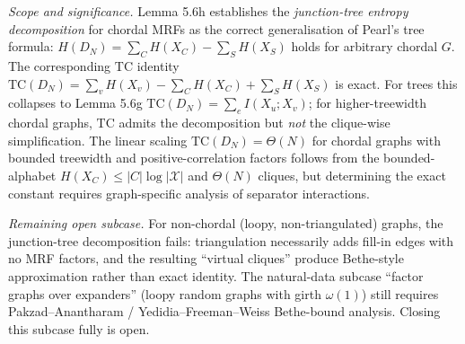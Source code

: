 \documentclass[
]{article}
\begin{document}
\emph{Scope and significance.} Lemma 5.6h establishes the
\emph{junction-tree entropy decomposition} for chordal MRFs as the
correct generalisation of Pearl's tree formula:
$H(D_N) = \sum_C H(X_C) - \sum_S H(X_S)$ holds for arbitrary chordal
$G$. The corresponding $\mathrm{TC}$ identity
$\mathrm{TC}(D_N) = \sum_v H(X_v) - \sum_C H(X_C) + \sum_S H(X_S)$
is exact. For trees this collapses to Lemma 5.6g
$\mathrm{TC}(D_N) = \sum_e I(X_u; X_v)$; for higher-treewidth
chordal graphs, $\mathrm{TC}$ admits the decomposition but \emph{not}
the clique-wise simplification. The linear scaling
$\mathrm{TC}(D_N) = \Theta(N)$ for chordal graphs with bounded
treewidth and positive-correlation factors follows from the bounded-
alphabet $H(X_C) \leq |C| \log |\mathcal{X}|$ and $\Theta(N)$ cliques,
but determining the exact constant requires graph-specific analysis
of separator interactions.

\emph{Remaining open subcase.} For non-chordal (loopy, non-triangulated)
graphs, the junction-tree decomposition fails: triangulation
necessarily adds fill-in edges with no MRF factors, and the resulting
``virtual cliques'' produce Bethe-style approximation rather than
exact identity. The natural-data subcase ``factor graphs over
expanders'' (loopy random graphs with girth $\omega(1)$) still
requires Pakzad--Anantharam / Yedidia--Freeman--Weiss Bethe-bound
analysis. Closing this subcase fully is open.
\end{document}

